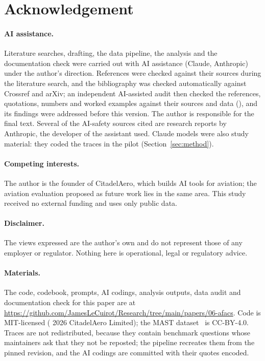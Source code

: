 \documentclass[11pt]{article}
\begin{document}
\section*{Acknowledgement}
\paragraph{AI assistance.} Literature searches, drafting, the data pipeline, the analysis and the documentation check were carried out with AI assistance (Claude, Anthropic) under the author's direction. References were checked against their sources during the literature search, and the bibliography was checked automatically against Crossref and arXiv; an independent AI-assisted audit then checked the references, quotations, numbers and worked examples against their sources and data (), and its findings were addressed before this version. The author is responsible for the final text. Several of the AI-safety sources cited are research reports by Anthropic, the developer of the assistant used. Claude models were also study material: they coded the traces in the pilot (Section~\ref{sec:method}).
\paragraph{Competing interests.} The author is the founder of CitadelAero, which builds AI tools for aviation; the aviation evaluation proposed as future work lies in the same area. This study received no external funding and uses only public data.
\paragraph{Disclaimer.} The views expressed are the author's own and do not represent those of any employer or regulator. Nothing here is operational, legal or regulatory advice.
\paragraph{Materials.} The code, codebook, prompts, AI codings, analysis outputs, data audit and documentation check for this paper are at \url{https://github.com/JamesLeCuirot/Research/tree/main/papers/06-afacs}. Code is MIT-licensed (\textcopyright{} 2026 CitadelAero Limited); the MAST dataset~\cite{cemri2025mast} is CC-BY-4.0. Traces are not redistributed, because they contain benchmark questions whose maintainers ask that they not be reposted; the pipeline recreates them from the pinned revision, and the AI codings are committed with their quotes encoded.
\end{document}
